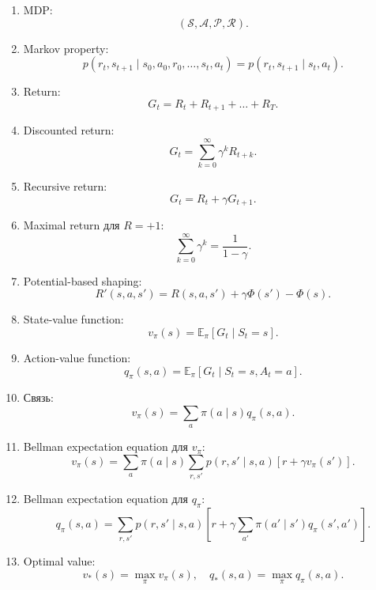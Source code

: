 \documentclass[a4paper,12pt]{article}
\begin{document}
\begin{enumerate}
    \item MDP:
    \[
    (\mathcal{S}, \mathcal{A}, \mathcal{P}, \mathcal{R}).
    \]

    \item Markov property:
    \[
    p(r_t,s_{t+1}\mid s_0,a_0,r_0,\dots,s_t,a_t)
    =
    p(r_t,s_{t+1}\mid s_t,a_t).
    \]

    \item Return:
    \[
    G_t = R_t + R_{t+1} + \dots + R_T.
    \]

    \item Discounted return:
    \[
    G_t =
    \sum_{k=0}^{\infty}
    \gamma^k R_{t+k}.
    \]

    \item Recursive return:
    \[
    G_t = R_t + \gamma G_{t+1}.
    \]

    \item Maximal return для \(R=+1\):
    \[
    \sum_{k=0}^{\infty}\gamma^k
    =
    \frac{1}{1-\gamma}.
    \]

    \item Potential-based shaping:
    \[
    R'(s,a,s')
    =
    R(s,a,s') + \gamma\Phi(s')-\Phi(s).
    \]

    \item State-value function:
    \[
    v_\pi(s)
    =
    \mathbb{E}_\pi[G_t\mid S_t=s].
    \]

    \item Action-value function:
    \[
    q_\pi(s,a)
    =
    \mathbb{E}_\pi[G_t\mid S_t=s,A_t=a].
    \]

    \item Связь:
    \[
    v_\pi(s)
    =
    \sum_a
    \pi(a\mid s)q_\pi(s,a).
    \]

    \item Bellman expectation equation для \(v_\pi\):
    \[
    v_\pi(s)
    =
    \sum_a
    \pi(a\mid s)
    \sum_{r,s'}
    p(r,s'\mid s,a)
    [
    r+\gamma v_\pi(s')
    ].
    \]

    \item Bellman expectation equation для \(q_\pi\):
    \[
    q_\pi(s,a)
    =
    \sum_{r,s'}
    p(r,s'\mid s,a)
    \left[
    r+
    \gamma
    \sum_{a'}
    \pi(a'\mid s')
    q_\pi(s',a')
    \right].
    \]

    \item Optimal value:
    \[
    v_*(s)=\max_\pi v_\pi(s),
    \quad
    q_*(s,a)=\max_\pi q_\pi(s,a).
    \]


\end{enumerate}
\end{document}
